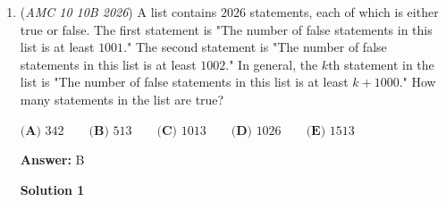 \begin{enumerate}
\textbf{Solution 6 (more casework)}

We do casework on the number of cells colored blue.

 
            \begin{itemize}
        \item \textbf{Case 1: No blue cells}
            \end{itemize}
            Since there will be no restriction, we simply have $2$ color choices for $4$ cells, so there are $2^4=16$ ways for this case.

 
            \begin{itemize}
        \item \textbf{Case 2: One blue cell}
            \end{itemize}
            We first have $\binom{4}{1}=4$ ways to choose the blue cell. Additionally, the two vertically and horizontally adjacent cells must be white by the problem condition (and this case). For the diagonally adjacent cell, it can be red or white, so we have $2 \cdot 4 = 8$ ways for this case.

 
            \begin{itemize}
        \item \textbf{Case 3/4/5: Two/three/four blue cell}
            \end{itemize}
            Note that if two or more blue cells are present, then every cell will be adjacent to a blue cell, so every non-blue cell must be white. Thus, cases $3$, $4$, $5$, yield $\binom{4}{2}+\binom{4}{3}+\binom{4}{4}=11$ ways.

 Summing up, our final answer is $16+11+8=35 \Rightarrow \boxed{E}$.~rz1729

 


	\item (\textit{AMC 10 10B 2026}) A list contains $2026$ statements, each of which is either true or false. The first statement is "The number of false statements in this list is at least $1001$." The second statement is "The number of false statements in this list is at least $1002$." In general, the $k$th statement in the list is "The number of false statements in this list is at least $k + 1000$." How many statements in the list are true?


 $\textbf{(A) } 342 \qquad \textbf{(B) } 513 \qquad \textbf{(C) } 1013 \qquad \textbf{(D) } 1026 \qquad \textbf{(E) } 1513$

 \textbf{Answer: }B



\textbf{Solution 1}


\end{enumerate}
